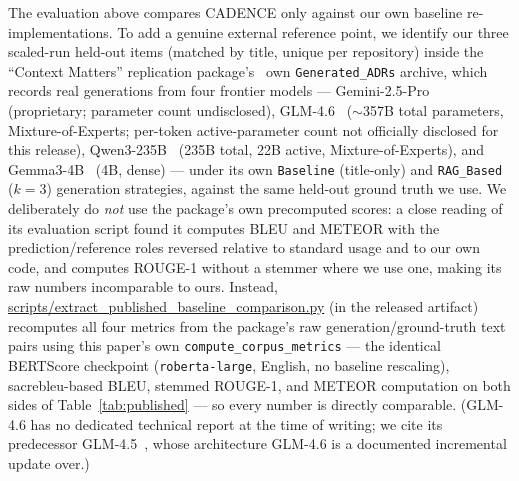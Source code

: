 \documentclass[lettersize,journal]{IEEEtran}
\begin{document}
The evaluation above compares CADENCE only against our own baseline re-implementations. To add a genuine external reference point, we identify our three scaled-run held-out items (matched by title, unique per repository) inside the ``Context Matters'' replication package's~\cite{contextmatters-zenodo} own \texttt{Generated\_ADRs} archive, which records real generations from four frontier models --- Gemini-2.5-Pro~\cite{gemini25} (proprietary; parameter count undisclosed), GLM-4.6~\cite{glm45} ($\sim$357B total parameters, Mixture-of-Experts; per-token active-parameter count not officially disclosed for this release), Qwen3-235B~\cite{qwen3} (235B total, 22B active, Mixture-of-Experts), and Gemma3-4B~\cite{gemma3} (4B, dense) --- under its own \texttt{Baseline} (title-only) and \texttt{RAG\_Based} ($k=3$) generation strategies, against the same held-out ground truth we use. We deliberately do \emph{not} use the package's own precomputed scores: a close reading of its evaluation script found it computes BLEU and METEOR with the prediction/reference roles reversed relative to standard usage and to our own code, and computes ROUGE-1 without a stemmer where we use one, making its raw numbers incomparable to ours. Instead, \url{scripts/extract_published_baseline_comparison.py} (in the released artifact) recomputes all four metrics from the package's raw generation/ground-truth text pairs using this paper's own \texttt{compute\_corpus\_metrics} --- the identical BERTScore checkpoint (\texttt{roberta-large}, English, no baseline rescaling), sacrebleu-based BLEU, stemmed ROUGE-1, and METEOR computation on both sides of Table~\ref{tab:published} --- so every number is directly comparable. (GLM-4.6 has no dedicated technical report at the time of writing; we cite its predecessor GLM-4.5~\cite{glm45}, whose architecture GLM-4.6 is a documented incremental update over.)
\end{document}
